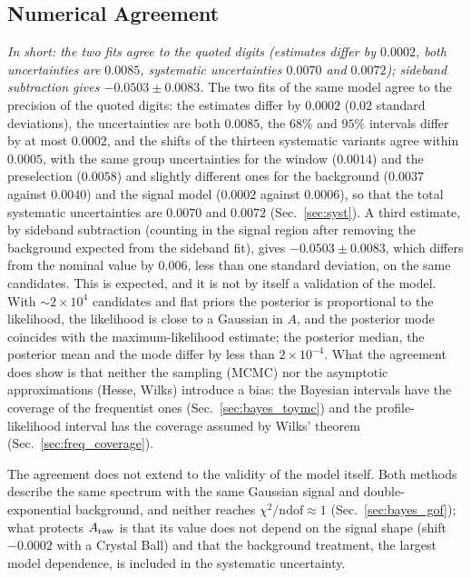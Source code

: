 \subsection{Numerical Agreement}
\label{sec:comparison_numbers}
\emph{In short: the two fits agree to the quoted digits (estimates differ by $0.0002$, both uncertainties are $0.0085$, systematic uncertainties $0.0070$ and $0.0072$); sideband subtraction gives $-0.0503\pm0.0083$.}
The two fits of the same model agree to the precision of the quoted digits: the estimates differ by $0.0002$ ($0.02$ standard deviations), the uncertainties are both $0.0085$, the $68\%$ and $95\%$ intervals differ by at most $0.0002$, and the shifts of the thirteen systematic variants agree within $0.0005$, with the same group uncertainties for the window ($0.0014$) and the preselection ($0.0058$) and slightly different ones for the background ($0.0037$ against $0.0040$) and the signal model ($0.0002$ against $0.0006$), so that the total systematic uncertainties are $0.0070$ and $0.0072$ (Sec.~\ref{sec:syst}). A third estimate, by sideband subtraction (counting in the signal region after removing the background expected from the sideband fit), gives $-0.0503\pm0.0083$, which differs from the nominal value by $0.006$, less than one standard deviation, on the same candidates. This is expected, and it is not by itself a validation of the model. With $\sim2\times10^4$ candidates and flat priors the posterior is proportional to the likelihood, the likelihood is close to a Gaussian in $A$, and the posterior mode coincides with the maximum-likelihood estimate; the posterior median, the posterior mean and the mode differ by less than $2\times10^{-4}$. What the agreement does show is that neither the sampling (MCMC) nor the asymptotic approximations (Hesse, Wilks) introduce a bias: the Bayesian intervals have the coverage of the frequentist ones (Sec.~\ref{sec:bayes_toymc}) and the profile-likelihood interval has the coverage assumed by Wilks' theorem (Sec.~\ref{sec:freq_coverage}).

The agreement does not extend to the validity of the model itself. Both methods describe the same spectrum with the same Gaussian signal and double-exponential background, and neither reaches $\chi^2/\mathrm{ndof}\approx1$ (Sec.~\ref{sec:bayes_gof}); what protects $A_{\mathrm{raw}}$ is that its value does not depend on the signal shape (shift $-0.0002$ with a Crystal Ball) and that the background treatment, the largest model dependence, is included in the systematic uncertainty.

